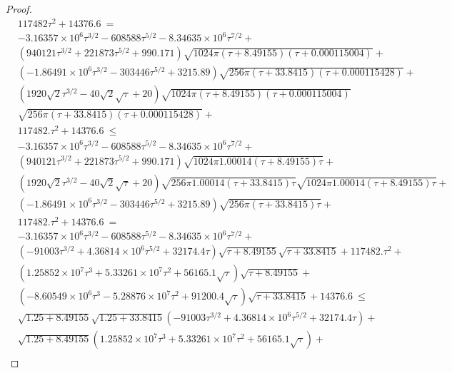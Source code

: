 \documentclass{article}
\renewcommand{\leq}{\leqslant}
\begin{document}
\begin{proof}
\begin{align}
&117482 \tau^2+14376.6\ = \\ \nonumber
&-3.16357\times 10^6 \tau^{3/2}-608588 \tau^{5/2}-8.34635\times 10^6 \tau^{7/2}+\\ \nonumber 
&\left(940121 \tau^{3/2}+221873 \tau^{5/2}+990.171\right) \sqrt{1024 \pi  (\tau+8.49155) (\tau+0.000115004)}+\\ \nonumber
&\left(-1.86491\times 10^6 \tau^{3/2}-303446 \tau^{5/2}+3215.89\right) \sqrt{256 \pi  (\tau+33.8415) (\tau+0.000115428)}+\\ \nonumber 
&\left(1920 \sqrt{2} \tau^{3/2}-40 \sqrt{2} \sqrt{\tau}+20\right) \sqrt{1024 \pi  (\tau+8.49155) (\tau+0.000115004)} \\ \nonumber
&\sqrt{256 \pi  (\tau+33.8415) (\tau+0.000115428)}+\\ \nonumber 
&117482. \tau^2+14376.6\ \leq \\ \nonumber 
&-3.16357\times 10^6 \tau^{3/2}-608588 \tau^{5/2}-8.34635\times 10^6 \tau^{7/2}+\\ \nonumber
&\left(940121 \tau^{3/2}+221873 \tau^{5/2}+990.171\right) \sqrt{1024 \pi  1.00014 (\tau+8.49155) \tau}+\\ \nonumber 
&\left(1920 \sqrt{2} \tau^{3/2}-40 \sqrt{2} \sqrt{\tau}+20\right) \sqrt{256 \pi  1.00014 (\tau+33.8415) \tau} \sqrt{1024 \pi  1.00014 (\tau+8.49155) \tau}+\\ \nonumber 
&\left(-1.86491\times 10^6 \tau^{3/2}-303446 \tau^{5/2}+3215.89\right) \sqrt{256 \pi  (\tau+33.8415) \tau}+\\ \nonumber
&117482. \tau^2+14376.6\ = \\ \nonumber 
&-3.16357\times 10^6 \tau^{3/2}-608588 \tau^{5/2}-8.34635\times 10^6 \tau^{7/2}+\\ \nonumber 
&\left(-91003 \tau^{3/2}+4.36814\times 10^6 \tau^{5/2}+32174.4 \tau\right) \sqrt{\tau+8.49155} \sqrt{\tau+33.8415}+117482. \tau^2+\\ \nonumber 
&\left(1.25852\times 10^7 \tau^3+5.33261\times 10^7 \tau^2+56165.1 \sqrt{\tau}\right) \sqrt{\tau+8.49155}+\\ \nonumber 
&\left(-8.60549\times 10^6 \tau^3-5.28876\times 10^7 \tau^2+91200.4 \sqrt{\tau}\right) \sqrt{\tau+33.8415}+14376.6\ \leq \\ \nonumber
&\sqrt{1.25 +8.49155} \sqrt{1.25 +33.8415} \left(-91003 \tau^{3/2}+4.36814\times 10^6 \tau^{5/2}+32174.4 \tau\right)+\\ \nonumber 
&\sqrt{1.25 +8.49155} \left(1.25852\times 10^7 \tau^3+5.33261\times 10^7 \tau^2+56165.1 \sqrt{\tau}\right)+\\ \nonumber 

\end{align}
\end{proof}
\end{document}
